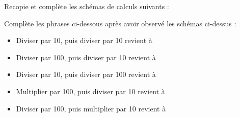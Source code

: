 \begin{myenumerate}
\item Recopie et complète les schémas de calculs suivants :
\par\vspace{1cm}\par
\begin{center}
  \kern2cm
\par\vspace{2cm}\par
{}\kern2cm
\par\vspace{2cm}\par
{}\kern2cm
\par\vspace{2cm}\par
{}\kern2cm
\end{center}
\par\vspace{1cm}\par
\item Complète les phrases ci-dessous après avoir observé les schémas ci-dessus :
\begin{itemize}
\item Diviser par 10, puis diviser par 10 revient à \dotfill
\item Diviser par 100, puis diviser par 10 revient à \dotfill
\item Diviser par 10, puis diviser par 100 revient à \dotfill
\item Multiplier par 100, puis diviser par 10 revient à \dotfill
\item Diviser par 100, puis multiplier par 10 revient à \dotfill
\end{itemize}
\end{myenumerate}